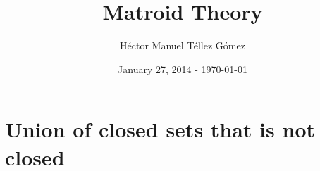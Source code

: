 \frontmatter
\title{Matroid Theory}
\author{Héctor Manuel Téllez Gómez}
\date{January 27, 2014 - \today}
\maketitle

\tableofcontents

\mainmatter


\chapter{Union of closed sets that is not closed}
